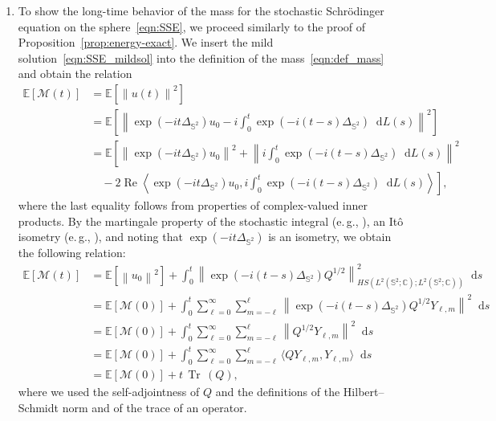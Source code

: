 \documentclass[11pt]{amsart}
\newcommand{\IC}{\mathbb{C}}
\newcommand{\E}{{\mathbb E}}
\newcommand{\IS}{\mathbb{S}}
\newcommand{\tr}{{\operatorname{Tr}\, }}
\newcommand{\cM}{\mathcal M}
\providecommand{\norm}[1]{\left\lVert#1\right\rVert}
\newcommand*\dd{\mathop{}\!\mathrm{d}}
\newcommand{\expp}[1]{\exp\left(#1\right)}
\renewcommand{\Re}{{\operatorname{Re}}}
\newcommand{\Deltalb}{\Delta_{\IS^2}}
\begin{document}
\begin{appendixproof}


   \begin{enumerate}[label=\roman*)]
    \item \label{pf-exact-mass} To show the long-time behavior of the mass for the stochastic Schr\"odinger equation on the sphere~\eqref{eqn:SSE}, we proceed
    similarly to the proof of Proposition~\ref{prop:energy-exact}. We insert the mild solution~\eqref{eqn:SSE_mildsol}
    into the definition of the mass~\eqref{eqn:def_mass} and obtain the relation
    \begin{align*}
    \E\left[\cM(t)\right] &= \E\left[\norm{u(t)}^2\right]\\
    & = \E\left[\norm{\expp{-it\Deltalb}u_0 - i\int_{0}^{t}\expp{-i(t-s)\Deltalb}\dd L(s)}^2\right]\\
    & = \E\left[\norm{\expp{-it\Deltalb}u_0}^2 + \norm{i \int_{0}^{t}\expp{-i(t-s)\Deltalb}\dd L(s)}^2\right.\\
    & \left. \quad - 2 \Re \left\langle \expp{-it\Deltalb}u_0, i \int_{0}^{t} \expp{-i(t-s)\Deltalb}\dd L(s) \right\rangle\right],
    \end{align*}
    where the last equality follows from properties of complex-valued inner products.
    By the martingale property of the stochastic integral (e.\,g., \cite[Corollary 8.17]{peszat2007}),
    an It\^o isometry (e.\,g., \cite[Corollary 8.17]{peszat2007}), and noting that $\expp{-it\Deltalb}$ is an isometry, we obtain the following relation:
    \begin{align*}
        \E\left[\cM(t)\right] &= \E\left[\norm{u_0}^2\right] + \int_{0}^{t}\norm{\expp{-i(t-s)\Deltalb}Q^{1/2}}^2_{HS({L^2(\IS^2; \IC)}; {L^2(\IS^2; \IC)})} \dd s\\
        &= \E\left[\cM(0)\right] + \int_{0}^{t} \sum_{\ell=0}^{\infty}\sum_{m=-\ell}^{\ell}\norm{\expp{-i(t-s)\Deltalb}Q^{1/2}Y_{\ell , m}}^2\dd s\\
        &= \E\left[\cM(0)\right] + \int_{0}^{t} \sum_{\ell=0}^{\infty}\sum_{m=-\ell}^{\ell}\norm{Q^{1/2}Y_{\ell , m}}^2\dd s\\
        &= \E\left[\cM(0)\right] + \int_{0}^{t} \sum_{\ell=0}^{\infty}\sum_{m=-\ell}^{\ell}\langle Q Y_{\ell , m}, Y_{\ell , m}\rangle\dd s\\
        & = \E\left[\cM(0)\right] + t\,\tr(Q),
    \end{align*}
    where we used the self-adjointness of $Q$ and the definitions of the Hilbert--Schmidt norm and of the trace of an operator.

\end{enumerate}
\end{appendixproof}
\end{document}

